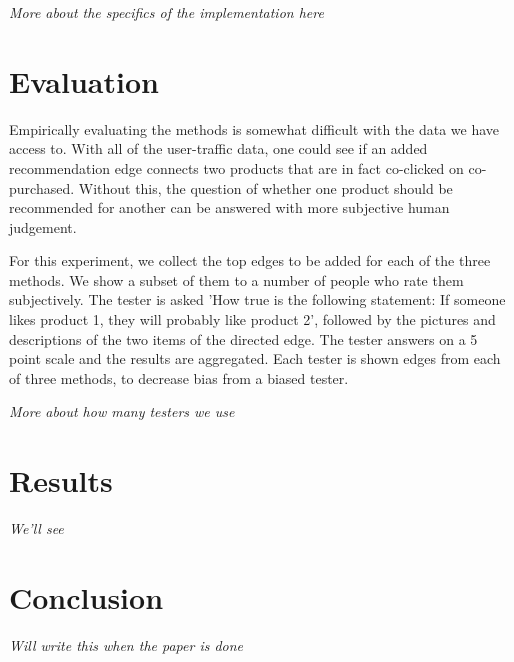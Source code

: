 \documentclass[10pt]{article}
\begin{document}
\emph{More about the specifics of the implementation here}

\section*{Evaluation}
Empirically evaluating the methods is somewhat difficult with the data we have
access to. With all of the user-traffic data, one could see if an added
recommendation edge connects two products that are in fact co-clicked on
co-purchased. Without this, the question of whether one product should be
recommended for another can be answered with more subjective human judgement.

For this experiment, we collect the top edges to be added for each of the three
methods. We show a subset of them to a number of people who rate them subjectively. 
The tester is asked 'How true is the following statement: If someone likes
product 1, they will probably like product 2', followed by the pictures and
descriptions of the two items of the directed edge. The tester answers on a 5
point scale and the results are aggregated. Each tester is shown edges from
each of three methods, to decrease bias from a biased tester.

\emph{More about how many testers we use}

\section*{Results}
\emph{We'll see}

\section*{Conclusion}
\emph{Will write this when the paper is done}
\end{document}
